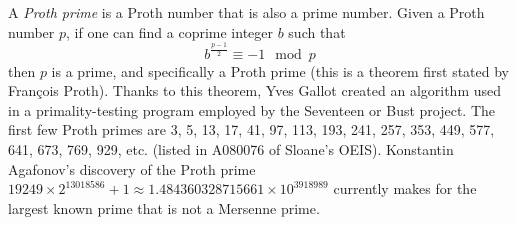 \documentclass[12pt]{article}
\begin{document}
A {\em Proth prime} is a Proth number that is also a prime number. Given a Proth number $p$, if one can find a coprime integer $b$ such that $$b^{\frac{p - 1}{2}} \equiv -1 \mod p$$ then $p$ is a prime, and specifically a Proth prime (this is a theorem first stated by Fran\c{c}ois Proth). Thanks to this theorem, Yves Gallot created an algorithm used in a primality-testing program employed by the Seventeen or Bust project. The first few Proth primes are 3, 5, 13, 17, 41, 97, 113, 193, 241, 257, 353, 449, 577, 641, 673, 769, 929, etc. (listed in A080076 of Sloane's OEIS). Konstantin Agafonov's discovery of the Proth prime $19249 \times 2^{13018586} + 1 \approx 1.484360328715661 \times 10^{3918989}$ currently makes for the largest known prime that is not a Mersenne prime.
\end{document}
